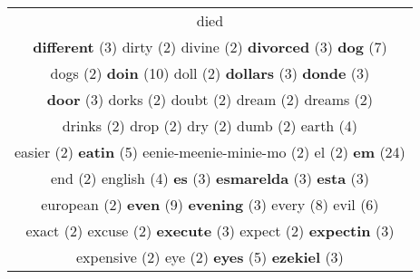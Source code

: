 \documentclass[12pt,a4paper]{article}
\begin{document}
\begin{center}
\begin{longtable}{|c|}
\textcolor{Verde} {died}} \footnotesize{(2)} {\small \textcolor{Laranja} {\bf difference}} \footnotesize{(3)}  \\ {\small \textcolor{Laranja} {\bf different}} \footnotesize{(3)} {\footnotesize \textcolor{Verde} {dirty}} \footnotesize{(2)} {\footnotesize \textcolor{Verde} {divine}} \footnotesize{(2)} {\small \textcolor{Laranja} {\bf divorced}} \footnotesize{(3)} {\LARGE \textcolor{Rosa} {\bf dog}} \footnotesize{(7)}  \\ {\footnotesize \textcolor{Verde} {dogs}} \footnotesize{(2)} {\Huge \textcolor{AzulEscuro} {\bf doin}} \footnotesize{(10)} {\footnotesize \textcolor{Verde} {doll}} \footnotesize{(2)} {\small \textcolor{Laranja} {\bf dollars}} \footnotesize{(3)} {\small \textcolor{Laranja} {\bf donde}} \footnotesize{(3)}  \\ {\small \textcolor{Laranja} {\bf door}} \footnotesize{(3)} {\footnotesize \textcolor{Verde} {dorks}} \footnotesize{(2)} {\footnotesize \textcolor{Verde} {doubt}} \footnotesize{(2)} {\footnotesize \textcolor{Verde} {dream}} \footnotesize{(2)} {\footnotesize \textcolor{Verde} {dreams}} \footnotesize{(2)}  \\ {\footnotesize \textcolor{Verde} {drinks}} \footnotesize{(2)} {\footnotesize \textcolor{Verde} {drop}} \footnotesize{(2)} {\footnotesize \textcolor{Verde} {dry}} \footnotesize{(2)} {\footnotesize \textcolor{Verde} {dumb}} \footnotesize{(2)} {\normalsize \textcolor{VerdeLocao} {earth}} \footnotesize{(4)}  \\ {\footnotesize \textcolor{Verde} {easier}} \footnotesize{(2)} {\large \textcolor{Roxo} {\bf eatin}} \footnotesize{(5)} {\footnotesize \textcolor{Verde} {eenie-meenie-minie-mo}} \footnotesize{(2)} {\footnotesize \textcolor{Verde} {el}} \footnotesize{(2)} {\Huge \textcolor{AzulEscuro} {\bf em}} \footnotesize{(24)}  \\ {\footnotesize \textcolor{Verde} {end}} \footnotesize{(2)} {\normalsize \textcolor{VerdeLocao} {english}} \footnotesize{(4)} {\small \textcolor{Laranja} {\bf es}} \footnotesize{(3)} {\small \textcolor{Laranja} {\bf esmarelda}} \footnotesize{(3)} {\small \textcolor{Laranja} {\bf esta}} \footnotesize{(3)}  \\ {\footnotesize \textcolor{Verde} {european}} \footnotesize{(2)} {\Huge \textcolor{AzulEscuro} {\bf even}} \footnotesize{(9)} {\small \textcolor{Laranja} {\bf evening}} \footnotesize{(3)} {\huge \textcolor{Amarelo} {every}} \footnotesize{(8)} {\Large \textcolor{VermEscuro} {evil}} \footnotesize{(6)}  \\ {\footnotesize \textcolor{Verde} {exact}} \footnotesize{(2)} {\footnotesize \textcolor{Verde} {excuse}} \footnotesize{(2)} {\small \textcolor{Laranja} {\bf execute}} \footnotesize{(3)} {\footnotesize \textcolor{Verde} {expect}} \footnotesize{(2)} {\small \textcolor{Laranja} {\bf expectin}} \footnotesize{(3)}  \\ {\footnotesize \textcolor{Verde} {expensive}} \footnotesize{(2)} {\footnotesize \textcolor{Verde} {eye}} \footnotesize{(2)} {\large \textcolor{Roxo} {\bf eyes}} \footnotesize{(5)} {\small \textcolor{Laranja} {\bf ezekiel}} \footnotesize{(3)} {\LARGE \textcolor{Rosa} 
\end{longtable}
\end{center}
\end{document}

